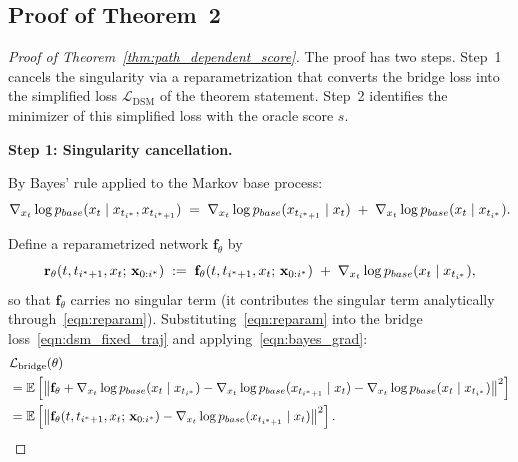 \documentclass{article}
\newcommand{\pbase}{p_{\normalfont{base}}}
\newcommand{\EE}{\mathbb{E}}
\begin{document}
\subsection{Proof of Theorem~2}
\label{sec:proof_thm_2}
\begin{proof}[Proof of Theorem~\ref{thm:path_dependent_score}]

The proof has two steps.  Step~1 cancels the singularity via a reparametrization that converts the bridge loss into the simplified loss $\mathcal{L}_\text{DSM}$ of the theorem statement.  Step~2 identifies the minimizer of this simplified loss with the oracle score $s$.

\bigskip
\noindent \textbf{Step 1: Singularity cancellation.}

By Bayes' rule applied to the Markov base process:
\begin{equation}\label{eqn:bayes_grad}
  \nabla_{x_t}\log \pbase(x_t \mid x_{t_{i^*}}, x_{t_{i^*+1}})
  \;=\;
  \nabla_{x_t}\log \pbase(x_{t_{i^*+1}} \mid x_t)
  \;+\;
  \nabla_{x_t}\log \pbase(x_t \mid x_{t_{i^*}}).
\end{equation}

Define a reparametrized network $\mathbf{f}_\theta$ by
\begin{equation}\label{eqn:reparam}
  \mathbf{r}_\theta(t, t_{i^*+1}, x_t;\, \mathbf{x}_{0:i^*})
  \;:=\;
  \mathbf{f}_\theta(t, t_{i^*+1}, x_t;\, \mathbf{x}_{0:i^*})
  \;+\;
  \nabla_{x_t}\log \pbase(x_t \mid x_{t_{i^*}}),
\end{equation}
so that $\mathbf{f}_\theta$ carries no singular term (it contributes the singular term analytically through~\eqref{eqn:reparam}).  Substituting~\eqref{eqn:reparam} into the bridge loss~\eqref{eqn:dsm_fixed_traj} and applying~\eqref{eqn:bayes_grad}:
\begin{align}
  &\mathcal{L}_\text{bridge}(\theta) \nonumber \\
  &= \EE\left[
      \bigl\|
        \mathbf{f}_\theta
        + \nabla_{x_t}\log \pbase(x_t \mid x_{t_{i^*}})
        - \nabla_{x_t}\log \pbase(x_{t_{i^*+1}} \mid x_t)
        - \nabla_{x_t}\log \pbase(x_t \mid x_{t_{i^*}})
      \bigr\|^2
    \right]
  \nonumber \\
  &= \EE\left[
      \bigl\|
        \mathbf{f}_\theta(t, t_{i^*+1}, x_t;\, \mathbf{x}_{0:i^*})
        - \nabla_{x_t}\log \pbase(x_{t_{i^*+1}} \mid x_t)
      \bigr\|^2
    \right].
  \label{eqn:simplified_loss}
\end{align}


\end{proof}
\end{document}
